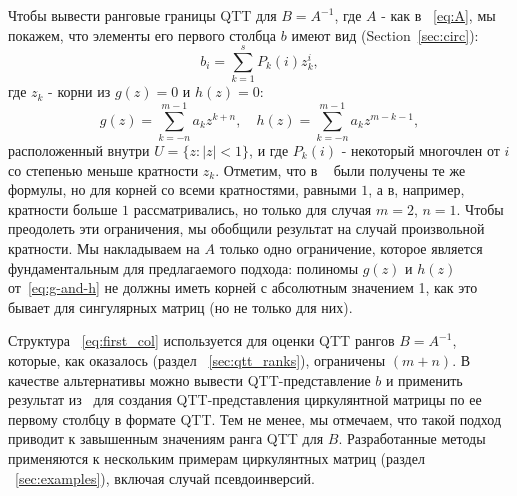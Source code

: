 
Чтобы вывести ранговые границы QTT для $B=A^{-1}$, где $A$ - как в ~\eqref{eq:A}, мы покажем, что элементы его первого столбца $b$ имеют вид (Section~\ref{sec:circ}):
\begin{equation}\label{eq:first_col}
b_{i} = \sum_{k=1}^s P_{k} (i) z_k^i,
\end{equation}
где $z_k$ - корни из $g(z)=0$ и $h(z)=0$:
\begin{equation}\label{eq:g-and-h}
g(z) = \sum_{k=-n}^{m-1}a_{k}z^{k+n}, \quad h(z) = \sum_{k=-n}^{m-1}a_{k}z^{m-k-1},
\end{equation}
%    
расположенный внутри $U=\{z:|z|<1\}$, и где $P_k(i)$ - некоторый многочлен от $i$ со степенью меньше кратности $z_k$.
Отметим, что в ~\cite{fuyong2011inverse} были получены те же формулы, но для корней со всеми кратностями, равными $1$, а в, например, ~\cite{searle1979inverting} кратности больше $1$ рассматривались, но только для случая $m=2$, $n=1$.
Чтобы преодолеть эти ограничения, мы обобщили результат на случай произвольной кратности.
Мы накладываем на $A$ только одно ограничение, которое является фундаментальным для предлагаемого подхода: полиномы $g(z)$ и $h(z)$ от~\eqref{eq:g-and-h} не должны иметь корней с абсолютным значением 1, как это бывает для сингулярных матриц (но не только для них).

Структура ~\eqref{eq:first_col} используется для оценки QTT рангов $B = A^{-1}$, которые, как оказалось (раздел ~\ref{sec:qtt_ranks}), ограничены $(m+n)$.
В качестве альтернативы можно вывести QTT-представление $b$ и применить результат из~\cite{khkaz-conv-2013} для создания QTT-представления циркулянтной матрицы по ее первому столбцу в формате QTT.
Тем не менее, мы отмечаем, что такой подход приводит к завышенным значениям ранга QTT для $B$.
Разработанные методы применяются к нескольким примерам циркулянтных матриц (раздел ~\ref{sec:examples}), включая случай псевдоинверсий.


